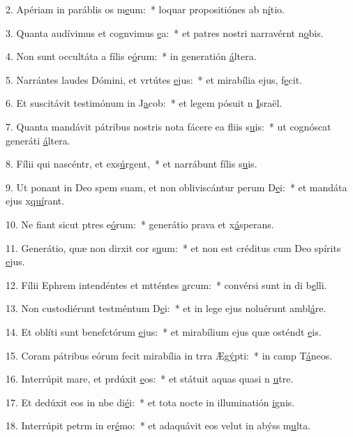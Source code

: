 2. Apériam in paráblis os m\uline{e}um:~* loquar propositiónes ab n\uline{í}tio.\par 
3. Quanta audívimus et cognvimus \uline{e}a:~* et patres nostri narravérnt n\uline{o}bis.\par 
4. Non sunt occultáta a fílis e\uline{ó}rum:~* in generatión \uline{á}ltera.\par 
5. Narrántes laudes Dómini, et vrtútes \uline{e}jus:~* et mirabília ejus,  f\uline{e}cit.\par 
6. Et suscitávit testimónum in J\uline{a}cob:~* et legem pósuit n \uline{I}sraël.\par 
7. Quanta mandávit pátribus nostris nota fácere ea fliis s\uline{u}is:~* ut cognóscat generáti \uline{á}ltera.\par 
8. Fílii qui nascéntr, et exs\uline{ú}rgent,~* et narrábunt fílis s\uline{u}is.\par 
9. Ut ponant in Deo spem suam, et non obliviscántur perum D\uline{e}i:~* et mandáta ejus x\uline{quí}rant.\par 
10. Ne fiant sicut ptres e\uline{ó}rum:~* generátio prava et x\uline{á}sperans.\par 
11. Generátio, quæ non dirxit cor s\uline{u}um:~* et non est créditus cum Deo spírits \uline{e}jus.\par 
12. Fílii Ephrem intendéntes et mtténtes \uline{a}rcum:~* convérsi sunt in di b\uline{e}lli.\par 
13. Non custodiérunt testméntum D\uline{e}i:~* et in lege ejus noluérunt ambl\uline{á}re.\par 
14. Et oblíti sunt benefctórum \uline{e}jus:~* et mirabílium ejus quæ osténdt \uline{e}is.\par 
15. Coram pátribus eórum fecit mirabília in trra Æg\uline{ý}pti:~* in camp T\uline{á}neos.\par 
16. Interrúpit mare, et prdúxit \uline{e}os:~* et státuit aquas quasi n \uline{u}tre.\par 
17. Et dedúxit eos in nbe di\uline{é}i:~* et tota nocte in illuminatión \uline{i}gnis.\par 
18. Interrúpit petrm in er\uline{é}mo:~* et adaquávit eos velut in abýss m\uline{u}lta.\par 

